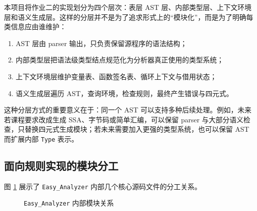 \documentclass[UTF8,a4paper,12pt]{ctexart}
\newcommand{\pkg}[1]{\texttt{#1}}
\begin{document}
本项目将作业二的实现划分为四个层次：表层 AST 层、内部类型层、上下文环境层和语义生成层。这样的分层并不是为了追求形式上的“模块化”，而是为了明确每类信息应由谁维护：

\begin{enumerate}[label=\arabic*.]
    \item AST 层由 parser 输出，只负责保留源程序的语法结构；
    \item 内部类型层把语法级类型结点规范化为分析器真正使用的类型系统；
    \item 上下文环境层维护变量表、函数签名表、循环上下文与借用状态；
    \item 语义生成层遍历 AST，查询环境，检查规则，最终产生错误与四元式。
\end{enumerate}

这种分层方式的重要意义在于：同一个 AST 可以支持多种后续处理。例如，未来若课程要求改成生成 SSA、字节码或简单汇编，可以保留 parser 与大部分语义检查，只替换四元式生成模块；若未来需要加入更强的类型系统，也可以保留 AST 而扩展内部 \pkg{Type} 表示。

\subsection{面向规则实现的模块分工}

图 \ref{fig:analyzer-modules} 展示了 \pkg{Easy\_Analyzer} 内部几个核心源码文件的分工关系。

\begin{figure}[H]
    \centering
    \caption{\pkg{Easy\_Analyzer} 内部模块关系}
    \label{fig:analyzer-modules}
\end{figure}
\end{document}
